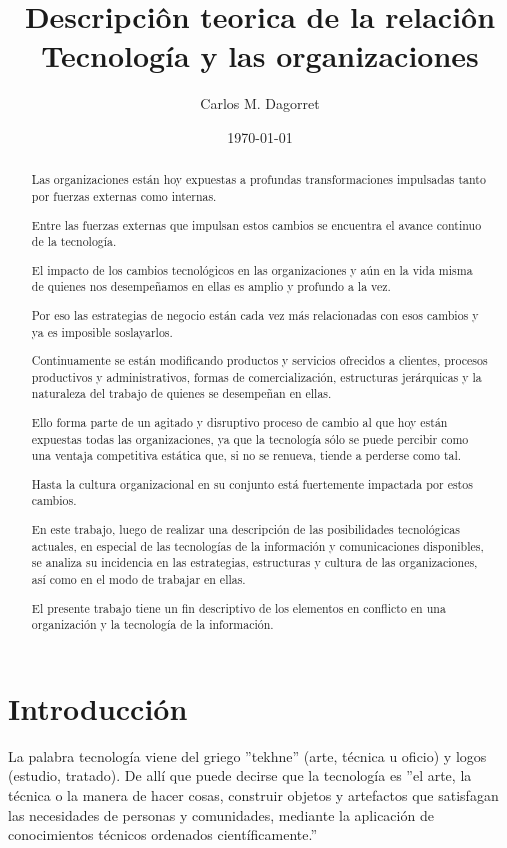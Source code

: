 \documentclass[a4paper, 12pt]{article}
\title{Descripciôn teorica de la relaciôn Tecnología y las organizaciones}
\author{Carlos M. Dagorret}
\date{\today}
\begin{document}
\maketitle

\begin{abstract}

Las organizaciones están hoy expuestas a profundas transformaciones impulsadas tanto por fuerzas externas como internas.

Entre las fuerzas externas que impulsan estos cambios se encuentra el avance continuo de la tecnología.

El impacto de los cambios tecnológicos en las organizaciones y aún en la vida misma de quienes nos desempeñamos en ellas es amplio y profundo a la vez.

Por eso las estrategias de negocio están cada vez más relacionadas con esos cambios y ya es imposible soslayarlos.

Continuamente se están modificando productos y servicios ofrecidos a clientes, procesos productivos y administrativos, formas de comercialización, estructuras jerárquicas y la naturaleza del trabajo de quienes se desempeñan en ellas.

Ello forma parte de un agitado y disruptivo proceso de cambio al que hoy están expuestas todas las organizaciones, ya que la tecnología sólo se puede percibir como una ventaja competitiva estática que, si no se renueva, tiende a perderse como tal.

Hasta la cultura organizacional en su conjunto está fuertemente impactada por estos cambios.

En este trabajo, luego de realizar una descripción de las posibilidades tecnológicas actuales, en especial de las tecnologías de la información y comunicaciones disponibles, se analiza su incidencia en las estrategias, estructuras y cultura de las organizaciones, así como en el modo de trabajar en ellas.

El presente trabajo tiene un fin descriptivo de los elementos en conflicto en una organización y la tecnología de la información.
\end{abstract}

\section{Introducción}
\label{sec:Introduccion}

La palabra tecnología viene del griego ''tekhne'' (arte, técnica u oficio) y logos (estudio, tratado). De allí que puede decirse que la tecnología es ''el arte, la técnica o la manera de hacer cosas, construir objetos y artefactos que satisfagan las necesidades de personas y comunidades, mediante la aplicación de conocimientos técnicos ordenados científicamente.''
\end{document}
